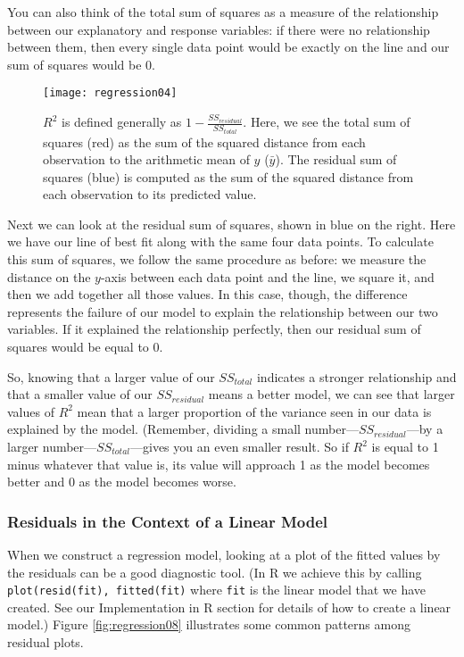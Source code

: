 You can also think of the total sum of squares as a measure of the relationship between our explanatory and response variables: if there were no relationship between them, then every single data point would be exactly on the line and our sum of squares would be $0$.

\begin{figure}[h]
\texttt{[image: regression04]}
\label{fig:regression04}
\caption{$R^2$ is defined generally as $1-\frac{SS_{residual}}{SS_{total}}$. Here, we see the total sum of squares (red) as the sum of the squared distance from each observation to the arithmetic mean of $y$ ($\bar{y}$). The residual sum of squares (blue) is computed as the sum of the squared distance from each observation to its predicted value.}
\end{figure}

Next we can look at the residual sum of squares, shown in blue on the right. Here we have our line of best fit along with the same four data points. To calculate this sum of squares, we follow the same procedure as before: we measure the distance on the $y$-axis between each data point and the line, we square it, and then we add together all those values. In this case, though, the difference represents the failure of our model to explain the relationship between our two variables. If it explained the relationship perfectly, then our residual sum of squares would be equal to 0.

So, knowing that a larger value of our $SS_{total}$ indicates a stronger relationship and that a smaller value of our $SS_{residual}$ means a better model, we can see that larger values of $R^2$ mean that a larger proportion of the variance seen in our data is explained by the model. (Remember, dividing a small number---$SS_{residual}$---by a larger number---$SS_{total}$---gives you an even smaller result. So if $R^2$ is equal to 1 minus whatever that value is, its value will approach 1 as the model becomes better and 0 as the model becomes worse.

\subsubsection{Residuals in the Context of a Linear Model}

When we construct a regression model, looking at a plot of the fitted values by the residuals can be a good diagnostic tool. (In R we achieve this by calling \verb|plot(resid(fit), fitted(fit)| where \verb|fit| is the linear model that we have created. See our Implementation in R section for details of how to create a linear model.) Figure \ref{fig:regression08} illustrates some common patterns among residual plots.

